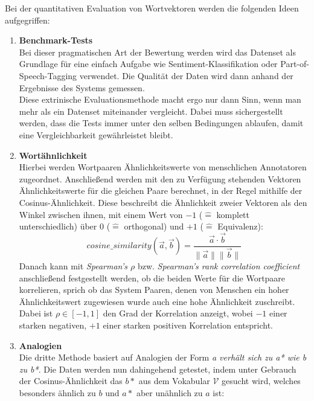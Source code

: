   Bei der quantitativen Evaluation von Wortvektoren werden die folgenden Ideen aufgegriffen:\\
  \begin{enumerate}
    \item \textbf{Benchmark-Tests}\\
      Bei dieser pragmatischen Art der Bewertung werden wird das Datenset als Grundlage für
      eine einfach Aufgabe wie Sentiment-Klassifikation oder Part-of-Speech-Tagging verwendet.
      Die Qualität der Daten wird dann anhand der Ergebnisse des Systems gemessen.\\
      Diese extrinische Evaluationsmethode macht ergo nur dann Sinn, wenn man mehr als ein Datenset
      miteinander vergleicht. Dabei muss sichergestellt werden, dass die Tests immer unter den
      selben Bedingungen ablaufen, damit eine Vergleichbarkeit gewährleistet bleibt.\\
    \item \textbf{Wortähnlichkeit}\\
      Hierbei werden Wortpaaren Ähnlichkeitswerte von menschlichen Annotatoren zugeordnet. Anschließend
      werden mit den zu Verfügung stehenden Vektoren Ähnlichkeitswerte für die gleichen Paare berechnet,
      in der Regel mithilfe der Cosinus-Ähnlichkeit. Diese beschreibt die Ähnlichkeit zweier Vektoren
      als den Winkel zwischen ihnen, mit einem Wert von $-1$ ($\hat{=}$ komplett unterschiedlich) über 0
      ($\hat{=}$ orthogonal) und $+1$ ($\hat{=}$ Equivalenz):
      \begin{equation}
        cosine\_similarity(\vec{a}, \vec{b}) = \frac{\vec{a} \cdot \vec{b}}{\|\vec{a}\| \|\vec{b}\|}
      \end{equation}
      Danach kann mit \emph{Spearman's $\rho$} bzw. \emph{Spearman's rank correlation coefficient}
      anschließend festgestellt werden, ob die beiden Werte für die Wortpaare korrelieren, sprich ob
      das System Paaren, denen von Menschen ein hoher Ähnlichkeitswert zugewiesen wurde auch eine hohe
      Ähnlichkeit zuschreibt. Dabei ist $\rho \in [-1, 1]$ den Grad der Korrelation anzeigt, wobei
      $-1$ einer starken negativen, $+1$ einer starken positiven Korrelation entspricht.
    \item \textbf{Analogien}\\
      Die dritte Methode basiert auf Analogien der Form \emph{a verhält sich zu a* wie b zu b*}.
      Die Daten werden nun dahingehend getestet, indem unter Gebrauch der Cosinus-Ähnlichkeit
      das $b*$ aus dem Vokabular $\mathcal{V}$ gesucht wird, welches besonders ähnlich zu $b$ und $a*$ aber unähnlich zu $a$ ist:

\end{enumerate}
